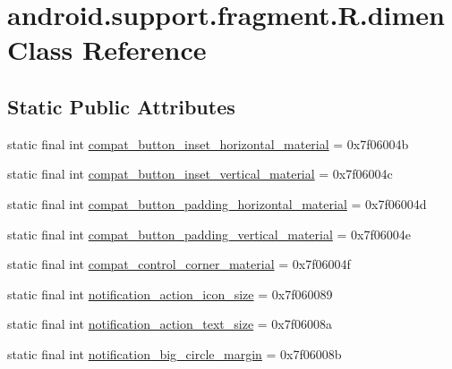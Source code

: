 \hypertarget{classandroid_1_1support_1_1fragment_1_1_r_1_1dimen}{}\section{android.\+support.\+fragment.\+R.\+dimen Class Reference}
\label{classandroid_1_1support_1_1fragment_1_1_r_1_1dimen}
\subsection*{Static Public Attributes}
\begin{DoxyCompactItemize}
\item 
static final int \mbox{\hyperlink{classandroid_1_1support_1_1fragment_1_1_r_1_1dimen_a377682e42827cffeaa800d71d75f4fd0}{compat\+\_\+button\+\_\+inset\+\_\+horizontal\+\_\+material}} = 0x7f06004b
\item 
static final int \mbox{\hyperlink{classandroid_1_1support_1_1fragment_1_1_r_1_1dimen_a343ee5497a2795bac9976fd290494dbb}{compat\+\_\+button\+\_\+inset\+\_\+vertical\+\_\+material}} = 0x7f06004c
\item 
static final int \mbox{\hyperlink{classandroid_1_1support_1_1fragment_1_1_r_1_1dimen_a474f66a8026c551de98f9c0c43a78c02}{compat\+\_\+button\+\_\+padding\+\_\+horizontal\+\_\+material}} = 0x7f06004d
\item 
static final int \mbox{\hyperlink{classandroid_1_1support_1_1fragment_1_1_r_1_1dimen_ae24f606372e9e42f86c05246ddb18045}{compat\+\_\+button\+\_\+padding\+\_\+vertical\+\_\+material}} = 0x7f06004e
\item 
static final int \mbox{\hyperlink{classandroid_1_1support_1_1fragment_1_1_r_1_1dimen_afced0a78ae01108e8b4d96cb05cfd84b}{compat\+\_\+control\+\_\+corner\+\_\+material}} = 0x7f06004f
\item 
static final int \mbox{\hyperlink{classandroid_1_1support_1_1fragment_1_1_r_1_1dimen_adf98f7aff4a04bb3a512866e72217c5f}{notification\+\_\+action\+\_\+icon\+\_\+size}} = 0x7f060089
\item 
static final int \mbox{\hyperlink{classandroid_1_1support_1_1fragment_1_1_r_1_1dimen_aa631976a40f5458a09b8bdc988c674d6}{notification\+\_\+action\+\_\+text\+\_\+size}} = 0x7f06008a
\item 
static final int \mbox{\hyperlink{classandroid_1_1support_1_1fragment_1_1_r_1_1dimen_a674b65742ac413519bb0cb7885d21ac4}{notification\+\_\+big\+\_\+circle\+\_\+margin}} = 0x7f06008b
\item 

\end{DoxyCompactItemize}
